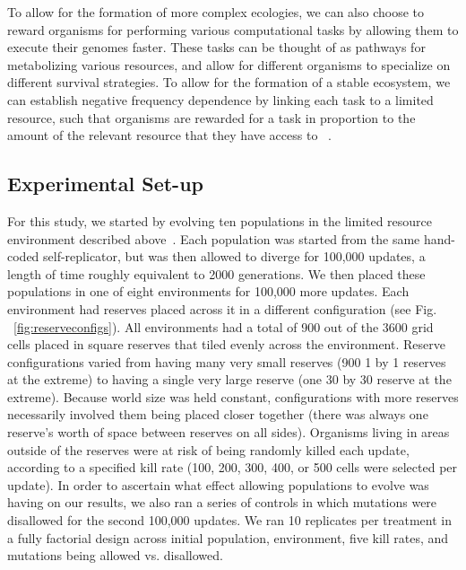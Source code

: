 \documentclass[letterpaper]{article}
\begin{document}
	To allow for the formation of more complex ecologies, we can also choose to reward organisms for performing various computational tasks by allowing them to execute their genomes faster. These tasks can be thought of as pathways for metabolizing various resources, and allow for different organisms to specialize on different survival strategies. To allow for the formation of a stable ecosystem, we can establish negative frequency dependence by linking each task to a limited resource, such that organisms are rewarded for a task in proportion to the amount of the relevant resource that they have access to ~\citep{chow_adaptive_2004}.
        
\subsection{Experimental Set-up}
        
	For this study, we started by evolving ten populations in the limited resource environment described above~\citep{chow_adaptive_2004}. Each population was started from the same hand-coded self-replicator, but was then allowed to diverge for 100,000 updates, a length of time roughly equivalent to 2000 generations. We then placed these populations in one of eight environments for 100,000 more updates. Each environment had reserves placed across it in a different configuration (see Fig. ~\ref{fig:reserveconfigs}). All environments had a total of 900 out of the 3600 grid cells placed in square reserves that tiled evenly across the environment. Reserve configurations varied from having many very small reserves (900 1 by 1 reserves at the extreme) to having a single very large reserve (one 30 by 30 reserve at the extreme). Because world size was held constant, configurations with more reserves necessarily involved them being placed closer together (there was always one reserve's worth of space between reserves on all sides). Organisms living in areas outside of the reserves were at risk of being randomly killed each update, according to a specified kill rate (100, 200, 300, 400, or 500 cells were selected per update). In order to ascertain what effect allowing populations to evolve was having on our results, we also ran a series of controls in which mutations were disallowed for the second 100,000 updates. We ran 10 replicates per treatment in a fully factorial design across initial population, environment, five kill rates, and mutations being allowed vs. disallowed.
%
%
%
%
%
%
%
    
\end{document}
